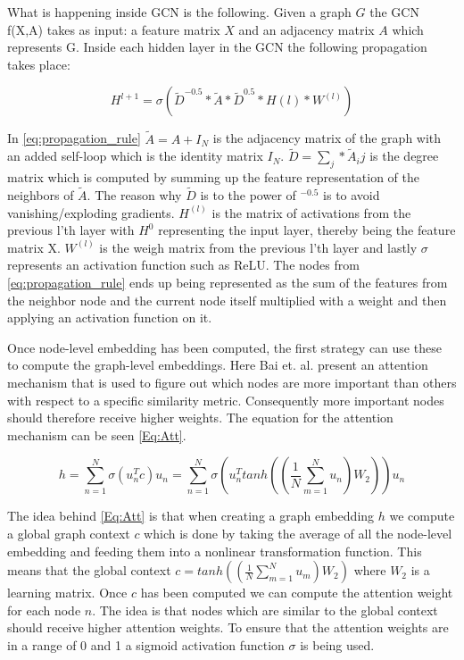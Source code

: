 What is happening inside GCN is the following. Given a graph $G$ the GCN f(X,A) takes as input: a feature matrix $X$ and an adjacency matrix $A$ which represents G. Inside each hidden layer in the GCN the following propagation takes place\cite{Kipf2016}:



\begin{equation}
\label{eq:propagation_rule}
H^{l+1} = \sigma (\tilde{D}^{-0.5}*\tilde{A}*\tilde{D}^{0.5}*H{(l)} * W^{(l)})
\end{equation}

In \autoref{eq:propagation_rule} $\tilde{A} = A +I_N$ is the adjacency matrix of the graph with an added self-loop which is the identity matrix $I_N$. $\tilde{D} = \sum_j * \tilde{A}_ij$ is the degree matrix which is computed by summing up the feature representation of the neighbors of $\tilde{A}$. The reason why $\tilde{D}$ is to the power of $^{-0.5}$ is to avoid vanishing/exploding gradients. $H^{(l)}$ is the matrix of activations from the previous l'th layer with $H^0$ representing the input layer, thereby being the feature matrix X. $W^{(l)}$ is the weigh matrix from the previous l'th layer and lastly $\sigma$ represents an activation function such as ReLU\cite{Kipf2016}. The nodes from \autoref{eq:propagation_rule} ends up being represented as the sum of the features from the neighbor node and the current node itself multiplied with a weight and then applying an activation function on it. 


Once node-level embedding has been computed, the first strategy can use these to compute the graph-level embeddings. Here Bai et. al. present an attention mechanism that is used to figure out which nodes are more important than others with respect to a specific similarity metric. Consequently more important nodes should therefore receive higher weights\cite{Bai2018}. The equation for the attention mechanism can be seen \autoref{Eq:Att}.



\begin{equation}\label{Eq:Att}
h= \sum^N_{n=1} \sigma(u^T_nc)u_n=\sum^N_{n=1}\sigma(u^T_ntanh((\frac{1}{N}\sum_{m=1}^Nu_n)W_2))u_n
\end{equation}

The idea behind \autoref{Eq:Att} is that when creating a graph embedding $h$ we compute a global graph context $c$ which is done by taking the average of all the node-level embedding and feeding them into a nonlinear transformation function. This means that the global context $c=tanh((\frac{1}{N}\sum_{m=1}^Nu_m)W_2)$ where $W_2$ is a learning matrix. Once $c$ has been computed we can compute the attention weight for each node $n$. The idea is that nodes which are similar to the global context should receive higher attention weights. To ensure that the attention weights are in a range of 0 and 1 a sigmoid activation function $\sigma$ is being used\cite{Bai2018}.


